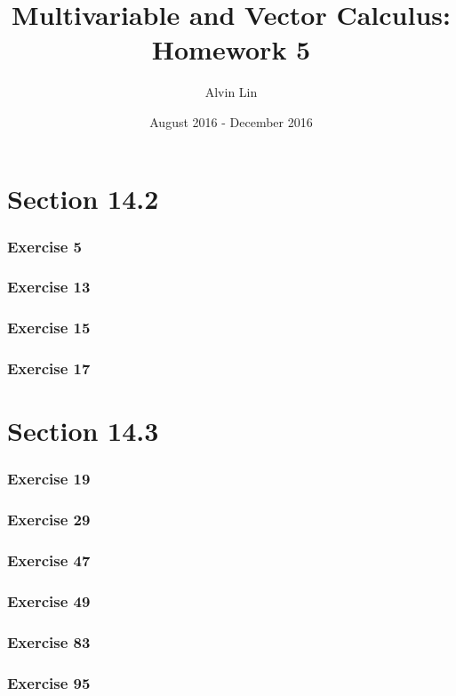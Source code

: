 \documentclass[letterpaper, 12pt]{math}
\title{Multivariable and Vector Calculus: Homework 5}
\author{Alvin Lin}
\date{August 2016 - December 2016}
\begin{document}
\maketitle

\section*{Section 14.2}

\subsubsection*{Exercise 5}

\subsubsection*{Exercise 13}

\subsubsection*{Exercise 15}

\subsubsection*{Exercise 17}

\section*{Section 14.3}

\subsubsection*{Exercise 19}
\subsubsection*{Exercise 29}
\subsubsection*{Exercise 47}
\subsubsection*{Exercise 49}
\subsubsection*{Exercise 83}
\subsubsection*{Exercise 95}
\end{document}
